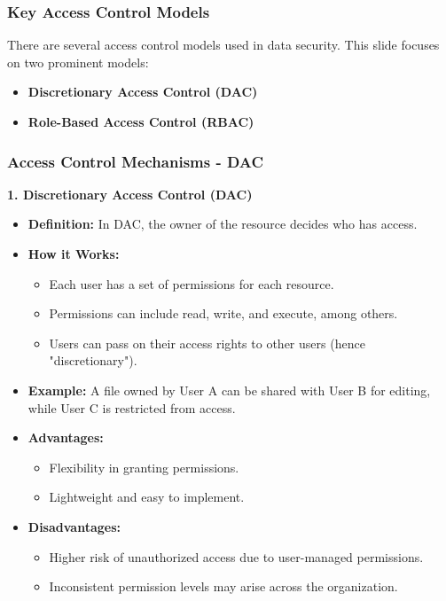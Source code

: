 \documentclass{beamer}
\begin{document}
\begin{frame}[fragile]
    \frametitle{Key Access Control Models}
    There are several access control models used in data security. This slide focuses on two prominent models:
    \begin{itemize}
        \item \textbf{Discretionary Access Control (DAC)}
        \item \textbf{Role-Based Access Control (RBAC)}
    \end{itemize}
\end{frame}

\begin{frame}[fragile]
    \frametitle{Access Control Mechanisms - DAC}
    \textbf{1. Discretionary Access Control (DAC)}
    \begin{itemize}
        \item \textbf{Definition:} In DAC, the owner of the resource decides who has access.
        \item \textbf{How it Works:}
        \begin{itemize}
            \item Each user has a set of permissions for each resource.
            \item Permissions can include read, write, and execute, among others.
            \item Users can pass on their access rights to other users (hence "discretionary").
        \end{itemize}
        \item \textbf{Example:} A file owned by User A can be shared with User B for editing, while User C is restricted from access.
        \item \textbf{Advantages:}
        \begin{itemize}
            \item Flexibility in granting permissions.
            \item Lightweight and easy to implement.
        \end{itemize}
        \item \textbf{Disadvantages:}
        \begin{itemize}
            \item Higher risk of unauthorized access due to user-managed permissions.
            \item Inconsistent permission levels may arise across the organization.
        \end{itemize}
    \end{itemize}
\end{frame}
\end{document}
